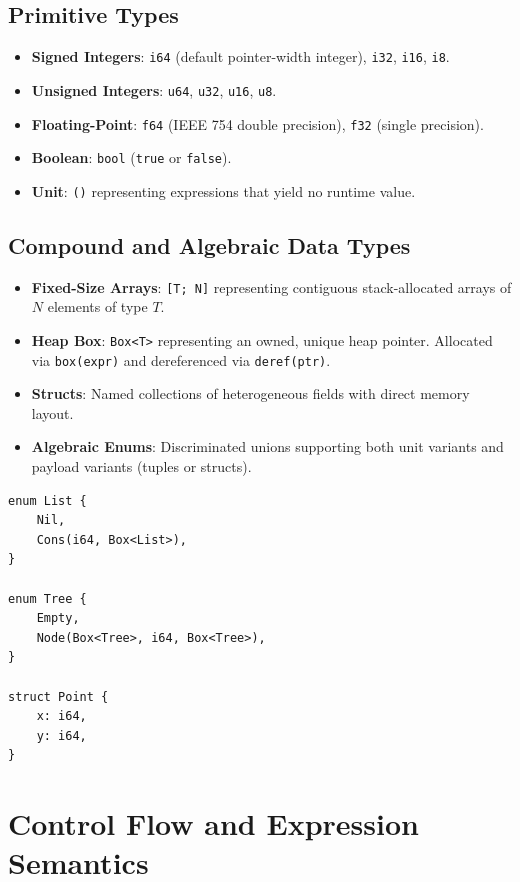 \subsection{Primitive Types}
\begin{itemize}
    \item \textbf{Signed Integers}: \texttt{i64} (default pointer-width integer), \texttt{i32}, \texttt{i16}, \texttt{i8}.
    \item \textbf{Unsigned Integers}: \texttt{u64}, \texttt{u32}, \texttt{u16}, \texttt{u8}.
    \item \textbf{Floating-Point}: \texttt{f64} (IEEE 754 double precision), \texttt{f32} (single precision).
    \item \textbf{Boolean}: \texttt{bool} (\texttt{true} or \texttt{false}).
    \item \textbf{Unit}: \texttt{()} representing expressions that yield no runtime value.
\end{itemize}

\subsection{Compound and Algebraic Data Types}
\begin{itemize}
    \item \textbf{Fixed-Size Arrays}: \texttt{[T; N]} representing contiguous stack-allocated arrays of $N$ elements of type $T$.
    \item \textbf{Heap Box}: \texttt{Box<T>} representing an owned, unique heap pointer. Allocated via \texttt{box(expr)} and dereferenced via \texttt{deref(ptr)}.
    \item \textbf{Structs}: Named collections of heterogeneous fields with direct memory layout.
    \item \textbf{Algebraic Enums}: Discriminated unions supporting both unit variants and payload variants (tuples or structs).
\end{itemize}

\begin{lstlisting}[language=NumLang, caption={Definition of Recursive Algebraic Data Types in NumLang.}]
enum List {
    Nil,
    Cons(i64, Box<List>),
}

enum Tree {
    Empty,
    Node(Box<Tree>, i64, Box<Tree>),
}

struct Point {
    x: i64,
    y: i64,
}
\end{lstlisting}

\section{Control Flow and Expression Semantics}
\label{sec:lang:control_flow}

